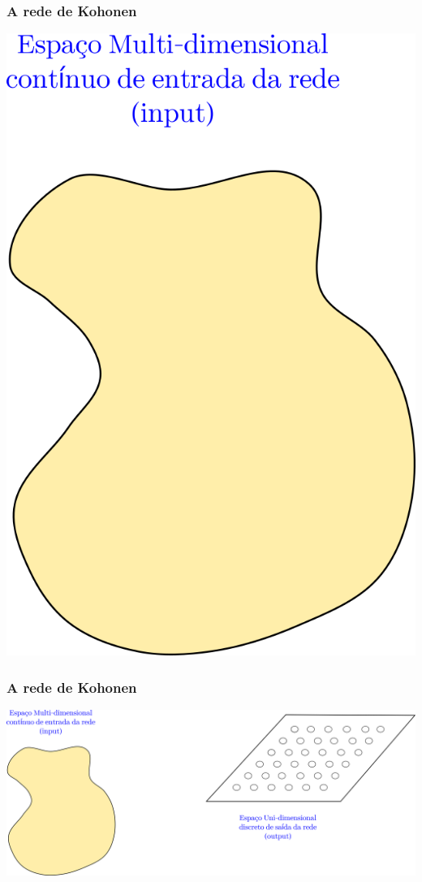 \documentclass[10pt]{beamer} %
\begin{document}
\begin{frame}
	\frametitle{A rede de Kohonen}
	\includegraphics[scale=0.5]{Imagens/IntroKoho1.png} 
	
\end{frame}


\begin{frame}
	\frametitle{A rede de Kohonen}
	\includegraphics[scale=0.5]{Imagens/IntroKoho2.png} 
	
\end{frame}
\end{document}
